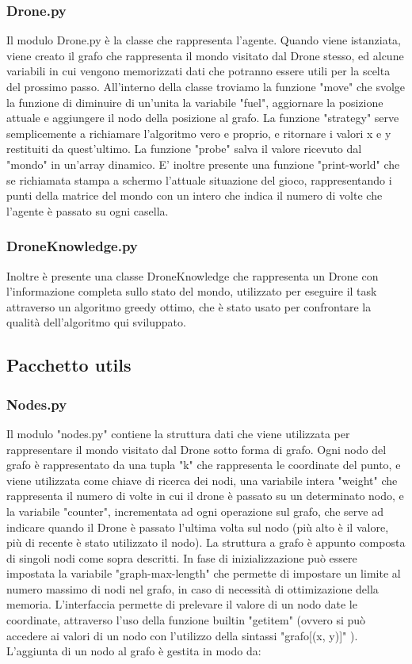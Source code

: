 \subsubsection{Drone.py}
Il modulo Drone.py è la classe che rappresenta l'agente. Quando viene istanziata, viene creato il grafo che rappresenta il mondo visitato dal Drone stesso, ed alcune variabili in cui vengono memorizzati dati che potranno essere utili per la scelta del prossimo passo. All'interno della classe troviamo la funzione "move" che svolge la funzione di diminuire di un'unita la variabile "fuel", aggiornare la posizione attuale e aggiungere il nodo della posizione al grafo. La funzione "strategy" serve semplicemente a richiamare l'algoritmo vero e proprio, e ritornare i valori x e y restituiti da quest'ultimo. La funzione "probe" salva il valore ricevuto dal "mondo" in un'array dinamico. E' inoltre presente una funzione "print-world" che se richiamata stampa a schermo l'attuale situazione del gioco, rappresentando i punti della matrice del mondo con un intero che indica il numero di volte che l'agente è passato su ogni casella.
\subsubsection{DroneKnowledge.py}
Inoltre è presente una classe DroneKnowledge che rappresenta un Drone con l'informazione completa sullo stato del mondo, utilizzato per eseguire il task attraverso un algoritmo greedy ottimo, che è stato usato per confrontare la qualità dell'algoritmo qui sviluppato.
\subsection{Pacchetto utils}
\subsubsection{Nodes.py}
Il modulo "nodes.py" contiene la struttura dati che viene utilizzata per rappresentare il mondo visitato dal Drone sotto forma di grafo. Ogni nodo del grafo è rappresentato da una tupla "k" che rappresenta le coordinate del punto, e viene utilizzata come chiave di ricerca dei nodi, una variabile intera "weight" che rappresenta il numero di volte in cui il drone è passato su un determinato nodo, e la variabile "counter", incrementata ad ogni operazione sul grafo, che serve ad indicare quando il Drone è passato l'ultima volta sul nodo (più alto è il valore, più di recente è stato utilizzato il nodo). 
La struttura a grafo è appunto composta di singoli nodi come sopra descritti. In fase di inizializzazione può essere impostata la variabile "graph-max-length" che permette di impostare un limite al numero massimo di nodi nel grafo, in caso di necessità di ottimizazione della memoria. L'interfaccia permette di prelevare il valore di un nodo date le coordinate, attraverso l'uso della funzione builtin "getitem" (ovvero si può accedere ai valori di un nodo con l'utilizzo della sintassi "grafo[(x, y)]" ). L'aggiunta di un nodo al grafo è gestita in modo da:

